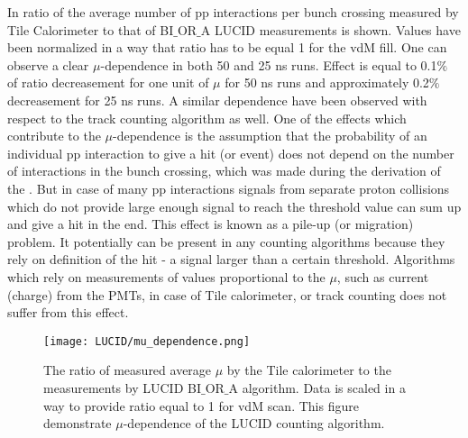 In  ratio of the average number of pp interactions per bunch crossing measured by Tile Calorimeter to that of BI$\_$OR$\_$A LUCID measurements is shown.
Values have been normalized in a way that ratio has to be equal 1 for the vdM fill.
One can observe a clear $\mu$-dependence in both 50 and 25 ns runs. Effect is equal to 0.1$\%$ of ratio decreasement for one unit of $\mu$ for 50 ns runs and approximately 0.2$\%$
decreasement for 25 ns runs.
A similar dependence have been observed with respect to the track counting algorithm as well.
One of the effects which contribute to the $\mu$-dependence is the assumption that the probability of an individual pp interaction to give a hit (or event) does not depend on the number of interactions in the bunch crossing, which was made during the derivation of the .
But in case of many pp interactions signals from separate proton collisions which do not provide large enough signal to reach the threshold value can sum up and give a hit in the end. 
This effect is known as a pile-up (or migration) problem.
It potentially can be present in any counting algorithms because they rely on definition of the hit - a signal larger than a certain threshold.
Algorithms which rely on measurements of values proportional to the $\mu$, such as current (charge) from the PMTs, in case of Tile calorimeter, or track counting does not suffer from this effect.



\begin{figure}
\centering
\texttt{[image: LUCID/mu\_dependence.png]}
\caption{The ratio of measured average $\mu$ by the Tile calorimeter to the measurements by LUCID BI$\_$OR$\_$A algorithm. Data is scaled in a way to provide ratio equal to 1 for vdM scan.
This figure demonstrate $\mu$-dependence of the LUCID counting algorithm.}
\label{fig:mu_dependence}
\end{figure}

